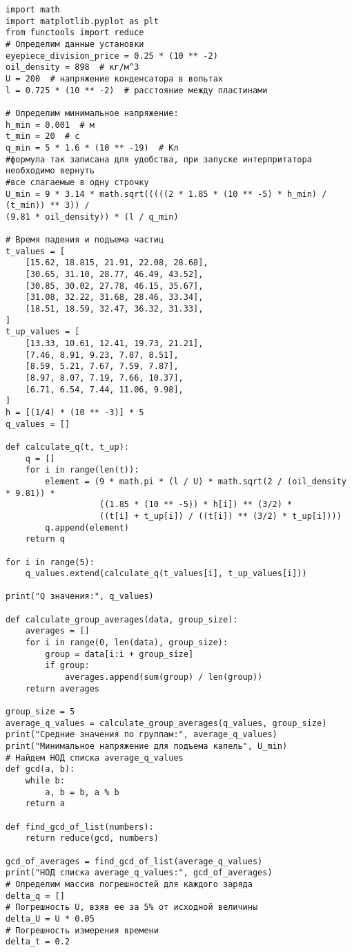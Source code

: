 \documentclass[a4paper,12pt]{article}
\begin{document}
\begin{verbatim}
import math
import matplotlib.pyplot as plt
from functools import reduce
# Определим данные установки
eyepiece_division_price = 0.25 * (10 ** -2)
oil_density = 898  # кг/м^3
U = 200  # напряжение конденсатора в вольтах
l = 0.725 * (10 ** -2)  # расстояние между пластинами

# Определим минимальное напряжение:
h_min = 0.001  # м
t_min = 20  # с
q_min = 5 * 1.6 * (10 ** -19)  # Кл
#формула так записана для удобства, при запуске интерпритатора необходимо вернуть
#все слагаемые в одну строчку
U_min = 9 * 3.14 * math.sqrt(((((2 * 1.85 * (10 ** -5) * h_min) / (t_min)) ** 3)) / 
(9.81 * oil_density)) * (l / q_min)

# Время падения и подъема частиц
t_values = [
    [15.62, 18.815, 21.91, 22.08, 28.68],
    [30.65, 31.10, 28.77, 46.49, 43.52],
    [30.85, 30.02, 27.78, 46.15, 35.67],
    [31.08, 32.22, 31.68, 28.46, 33.34],
    [18.51, 18.59, 32.47, 36.32, 31.33],
]
t_up_values = [
    [13.33, 10.61, 12.41, 19.73, 21.21],
    [7.46, 8.91, 9.23, 7.87, 8.51],
    [8.59, 5.21, 7.67, 7.59, 7.87],
    [8.97, 8.07, 7.19, 7.66, 10.37],
    [6.71, 6.54, 7.44, 11.06, 9.98],
]
h = [(1/4) * (10 ** -3)] * 5
q_values = []

def calculate_q(t, t_up):
    q = []
    for i in range(len(t)):
        element = (9 * math.pi * (l / U) * math.sqrt(2 / (oil_density * 9.81)) *
                   ((1.85 * (10 ** -5)) * h[i]) ** (3/2) *
                   ((t[i] + t_up[i]) / ((t[i]) ** (3/2) * t_up[i])))
        q.append(element)
    return q

for i in range(5):
    q_values.extend(calculate_q(t_values[i], t_up_values[i]))

print("Q значения:", q_values)

def calculate_group_averages(data, group_size):
    averages = []
    for i in range(0, len(data), group_size):
        group = data[i:i + group_size]
        if group:
            averages.append(sum(group) / len(group))
    return averages

group_size = 5
average_q_values = calculate_group_averages(q_values, group_size)
print("Средние значения по группам:", average_q_values)
print("Минимальное напряжение для подъема капель", U_min)
# Найдем НОД списка average_q_values
def gcd(a, b):
    while b:
        a, b = b, a % b
    return a

def find_gcd_of_list(numbers):
    return reduce(gcd, numbers)

gcd_of_averages = find_gcd_of_list(average_q_values)
print("НОД списка average_q_values:", gcd_of_averages)
# Определим массив погрешностей для каждого заряда
delta_q = []
# Погрешность U, взяв ее за 5% от исходной величины
delta_U = U * 0.05  
# Погрешность измерения времени
delta_t = 0.2


\end{verbatim}
\end{document}
